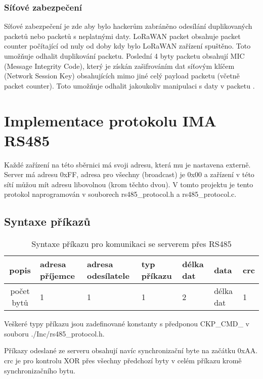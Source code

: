 \subsubsection{Síťové zabezpečení}
Síťové zabezpečení je zde aby bylo hackerům zabráněno odesílání duplikovaných packetů nebo packetů s neplatnými daty.
LoRaWAN packet obsahuje packet counter počítající od nuly od doby kdy bylo LoRaWAN zařízení spuštěno. Toto umožňuje odhalit duplikování packetu.
Poslední 4 byty packetu obsahují MIC (Message Integrity Code), který je získán zašifrováním dat síťovým klíčem (Network Session Key) obsahujících mimo jiné celý payload packetu (včetně packet counter). Toto umožňuje odhalit jakoukoliv manipulaci s daty v packetu \cite{lwSpec} \cite{lwSecur}.



\section{Implementace protokolu IMA RS485}
Každé zařízení na této sběrnici má svoji adresu, která mu je nastavena externě. Server má adresu  0xFF, adresa pro všechny (broadcast) je 0x00 a zařízení v této sítí můžou mít adresu libovolnou (krom těchto dvou). V tomto projektu je tento protokol naprogramován v souborech rs485\_protocol.h a rs485\_protocol.c.

\subsection{Syntaxe příkazů}

\begin{table}[!h]
    \centering
\begin{tabular}{ |c|| p{1.5cm} | p{1.5cm} | p{1cm} | p{1cm} | p{1cm} | p{1cm} | }
 \hline
 popis      & adresa příjemce & adresa odesílatele & typ příkazu & délka dat & data & crc\\ \hline
 počet bytů & 1               & 1   & 1     & 2     & délka dat     & 1 \\ 
 \hline
\end{tabular}
    \caption{Syntaxe příkazu pro komunikaci se serverem přes RS485}
    \label{table:1}
\end{table}

Veškeré typy příkazu jsou zadefinované konstanty s předponou CKP\_CMD\_ v souboru ./Inc/rs485\_protocol.h.

Příkazy odeslané ze serveru obsahují navíc synchronizační byte na začátku 0xAA.
crc je pro kontrolu XOR přes všechny předchozí byty v celém příkazu kromě synchronizačního bytu.



